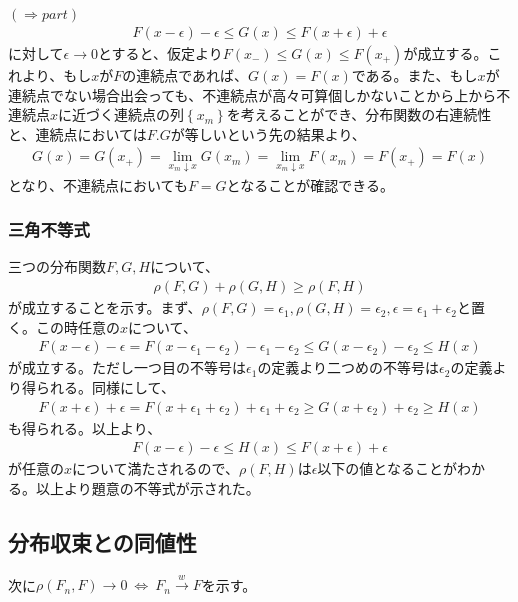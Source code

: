 \documentclass{article}
\begin{document}
\noindent $(\Rightarrow part)$
\begin{align*}
	F(x - \epsilon) - \epsilon \leq G(x) \leq F(x + \epsilon) + \epsilon
\end{align*}
に対して$\epsilon \to 0$とすると、仮定より$F(x_{-}) \leq G(x) \leq F(x_{+})$が成立する。これより、もし$x$が$F$の連続点であれば、$G(x) = F(x)$である。また、もし$x$が連続点でない場合出会っても、不連続点が高々可算個しかないことから上から不連続点$x$に近づく連続点の列$\left\{ x_m \right\}$を考えることができ、分布関数の右連続性と、連続点においては$F.G$が等しいという先の結果より、
\begin{align*}
	G(x) = G(x_{+}) = \lim_{x_m \downarrow x} G(x_m) = \lim_{x_m \downarrow x} F(x_m) = F(x_{+}) = F(x)
\end{align*}
となり、不連続点においても$F = G$となることが確認できる。

\subsubsection{三角不等式}
三つの分布関数$F,G,H$について、
\begin{align*}
	\rho\left( F, G \right) + \rho\left( G, H \right) \geq \rho\left( F, H \right)
\end{align*}
が成立することを示す。まず、$\rho\left( F, G \right) = \epsilon_1, \rho\left( G, H \right) = \epsilon_2, \epsilon = \epsilon_1 + \epsilon_2$と置く。この時任意の$x$について、
\begin{align*}
	F\left( x - \epsilon \right) - \epsilon = F\left(x - \epsilon_1 - \epsilon_2 \right) - \epsilon_1 - \epsilon_2 \leq G\left( x - \epsilon_2 \right) - \epsilon_2 \leq H(x)
\end{align*}
が成立する。ただし一つ目の不等号は$\epsilon_1$の定義より二つめの不等号は$\epsilon_2$の定義より得られる。同様にして、
\begin{align*}
	F\left( x + \epsilon \right) + \epsilon = F\left(x + \epsilon_1 + \epsilon_2 \right) +\epsilon_1 + \epsilon_2 \geq G\left( x + \epsilon_2 \right) + \epsilon_2 \geq H(x)
\end{align*}
も得られる。以上より、
\begin{align*}
	F\left( x - \epsilon \right) - \epsilon \leq H(x) \leq F\left( x + \epsilon \right) + \epsilon
\end{align*}
が任意の$x$について満たされるので、$\rho\left( F, H \right)$は$\epsilon$以下の値となることがわかる。以上より題意の不等式が示された。

\subsection{分布収束との同値性}
次に$\rho\left( F_n, F \right) \to 0\ \Leftrightarrow\ F_n \xrightarrow{w} F$を示す。
\end{document}
